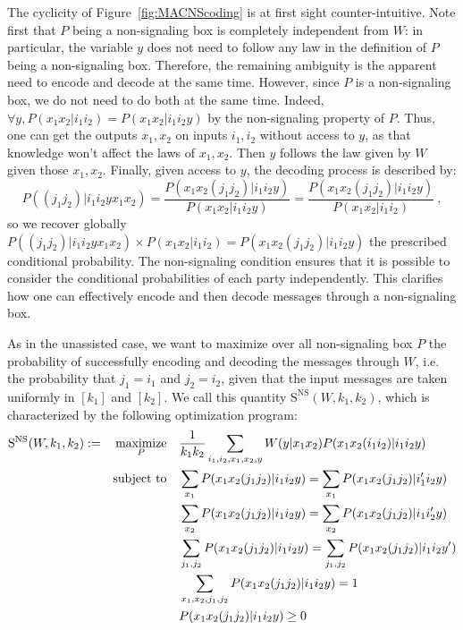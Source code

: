 The cyclicity of Figure~\ref{fig:MACNScoding} is at first sight counter-intuitive. Note first that $P$ being a non-signaling box is completely independent from $W$: in particular, the variable $y$ does not need to follow any law in the definition of $P$ being a non-signaling box. Therefore, the remaining ambiguity is the apparent need to encode and decode at the same time. However, since $P$ is a non-signaling box, we do not need to do both at the same time. Indeed, $\forall y, P(x_1x_2|i_1i_2) = P(x_1x_2|i_1i_2y)$ by the non-signaling property of $P$. Thus, one can get the outputs $x_1,x_2$ on inputs $i_1,i_2$ without access to $y$, as that knowledge won't affect the laws of $x_1,x_2$. Then $y$ follows the law given by $W$ given those $x_1,x_2$. Finally, given access to $y$, the decoding process is described by:
          \[ P((j_1 j_2)|i_1 i_2 y x_1 x_2) = \frac{P(x_1 x_2 (j_1 j_2)|i_1 i_2 y)}{P(x_1 x_2 |i_1 i_2 y)} = \frac{P(x_1 x_2 (j_1 j_2)|i_1 i_2 y)}{P(x_1 x_2 |i_1 i_2)} \ , \]
          so we recover globally $P((j_1 j_2)|i_1 i_2 y x_1 x_2) \times P(x_1 x_2 |i_1 i_2) = P(x_1 x_2 (j_1 j_2)|i_1 i_2 y)$ the prescribed conditional probability. 
          The non-signaling condition ensures that it is possible to consider the conditional probabilities of each party independently. This clarifies how one can effectively encode and then decode messages through a non-signaling box.

As in the unassisted case, we want to maximize over all non-signaling box $P$ the probability of successfully encoding and decoding the messages through $W$, i.e. the probability that $j_1 = i_1$ and  $j_2 = i_2$, given that the input messages are taken uniformly in $[k_1]$ and $[k_2]$. We call this quantity $\mathrm{S^{\mathrm{NS}}}(W,k_1,k_2)$, which is characterized by the following optimization program:
\begin{equation}
  \begin{aligned}
    \mathrm{S}^{\mathrm{NS}}(W,k_1,k_2) := &&\underset{P}{\operatorname{\text{maximize}}} &&& \frac{1}{k_1k_2} \sum_{i_1,i_2,x_1,x_2,y} W(y|x_1x_2)P(x_1x_2(i_1i_2)|i_1i_2y)\\
    &&\operatorname{\text{subject to}} &&& \sum_{x_1} P(x_1x_2(j_1j_2)|i_1i_2y) = \sum_{x_1} P(x_1x_2(j_1j_2)|i_1'i_2y)\\
    &&&&& \sum_{x_2} P(x_1x_2(j_1j_2)|i_1i_2y) = \sum_{x_2} P(x_1x_2(j_1j_2)|i_1i_2'y)\\
    &&&&& \sum_{j_1,j_2} P(x_1x_2(j_1j_2)|i_1i_2y) = \sum_{j_1,j_2} P(x_1x_2(j_1j_2)|i_1i_2y')\\
    &&&&& \sum_{x_1,x_2,j_1,j_2} P(x_1x_2(j_1j_2)|i_1i_2y) = 1\\
    &&&&& P(x_1x_2(j_1j_2)|i_1i_2y) \geq 0
  \end{aligned}
\end{equation}

